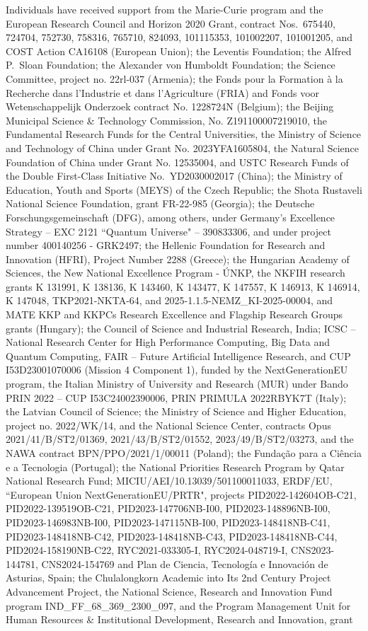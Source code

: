 \begin{acknowledgments}
 Individuals have received support from the Marie-Curie program and the European Research Council and Horizon 2020 Grant, contract Nos.\ 675440, 724704, 752730, 758316, 765710, 824093, 101115353, 101002207, 101001205, and COST Action CA16108 (European Union); the Leventis Foundation; the Alfred P.\ Sloan Foundation; the Alexander von Humboldt Foundation; the Science Committee, project no. 22rl-037 (Armenia); the Fonds pour la Formation \`a la Recherche dans l'Industrie et dans l'Agriculture (FRIA) and Fonds voor Wetenschappelijk Onderzoek contract No. 1228724N (Belgium); the Beijing Municipal Science \& Technology Commission, No. Z191100007219010, the Fundamental Research Funds for the Central Universities, the Ministry of Science and Technology of China under Grant No. 2023YFA1605804, the Natural Science Foundation of China under Grant No. 12535004, and USTC Research Funds of the Double First-Class Initiative No.\ YD2030002017 (China); the Ministry of Education, Youth and Sports (MEYS) of the Czech Republic; the Shota Rustaveli National Science Foundation, grant FR-22-985 (Georgia); the Deutsche Forschungsgemeinschaft (DFG), among others, under Germany's Excellence Strategy -- EXC 2121 ``Quantum Universe" -- 390833306, and under project number 400140256 - GRK2497; the Hellenic Foundation for Research and Innovation (HFRI), Project Number 2288 (Greece); the Hungarian Academy of Sciences, the New National Excellence Program - \'UNKP, the NKFIH research grants K 131991, K 138136, K 143460, K 143477, K 147557, K 146913, K 146914, K 147048, TKP2021-NKTA-64, and 2025-1.1.5-NEMZ\_KI-2025-00004, and MATE KKP and KKPCs Research Excellence and Flagship Research Groups grants (Hungary); the Council of Science and Industrial Research, India; ICSC -- National Research Center for High Performance Computing, Big Data and Quantum Computing, FAIR -- Future Artificial Intelligence Research, and CUP I53D23001070006 (Mission 4 Component 1), funded by the NextGenerationEU program, the Italian Ministry of University and Research (MUR) under Bando PRIN 2022 -- CUP I53C24002390006, PRIN PRIMULA 2022RBYK7T (Italy); the Latvian Council of Science; the Ministry of Science and Higher Education, project no. 2022/WK/14, and the National Science Center, contracts Opus 2021/41/B/ST2/01369, 2021/43/B/ST2/01552, 2023/49/B/ST2/03273, and the NAWA contract BPN/PPO/2021/1/00011 (Poland); the Funda\c{c}\~ao para a Ci\^encia e a Tecnologia (Portugal); the National Priorities Research Program by Qatar National Research Fund; MICIU/AEI/10.13039/501100011033, ERDF/EU, ``European Union NextGenerationEU/PRTR", projects PID2022-142604OB-C21, PID2022-139519OB-C21, PID2023-147706NB-I00, PID2023-148896NB-I00, PID2023-146983NB-I00, PID2023-147115NB-I00, PID2023-148418NB-C41, PID2023-148418NB-C42, PID2023-148418NB-C43, PID2023-148418NB-C44, PID2024-158190NB-C22, RYC2021-033305-I, RYC2024-048719-I, CNS2023-144781, CNS2024-154769 and Plan de Ciencia, Tecnolog{\'i}a e Innovaci{\'o}n de Asturias, Spain; the Chulalongkorn Academic into Its 2nd Century Project Advancement Project, the National Science, Research and Innovation Fund program IND\_FF\_68\_369\_2300\_097, and the Program Management Unit for Human Resources \& Institutional Development, Research and Innovation, grant 
\end{acknowledgments}
